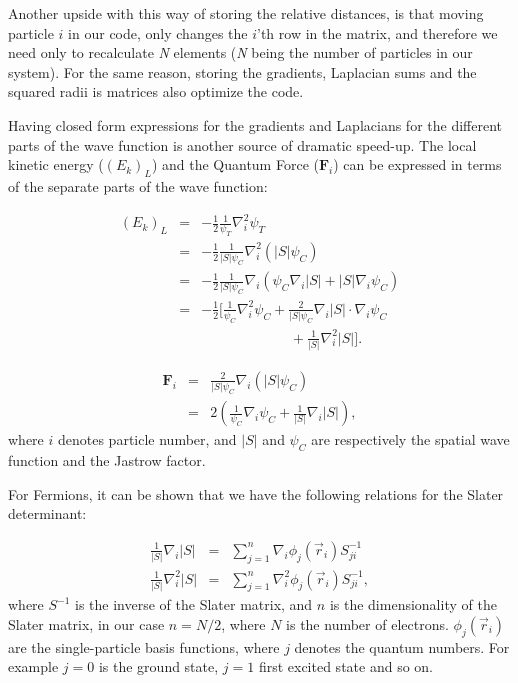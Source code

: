 Another upside with this way of storing the relative distances, is that moving particle $i$ in our code, only changes the $i$'th row in the matrix, and therefore we need only to recalculate \textit{N} elements (\textit{N} being the number of particles in our system). For the same reason, storing the gradients, Laplacian sums and the squared radii is matrices also optimize the code. 

Having closed form expressions for the gradients and Laplacians for the different parts of the wave function is another source of dramatic speed-up. The local kinetic energy ($(E_k)_L$) and the Quantum Force ($\mathbf{F}_i$) can be expressed in terms of the separate parts of the wave function:

\begin{eqnarray}
(E_k)_L &=& -\frac{1}{2}\frac{1}{\psi_T}\nabla_i^2 \psi_T \\
&=& -\frac{1}{2}\frac{1}{|S|\psi_C}\nabla_i^2(|S|\psi_C) \nonumber\\
&=& -\frac{1}{2}\frac{1}{|S|\psi_C} \nabla_i \left(\psi_C\nabla_i |S| + |S|\nabla_i \psi_C\right)\nonumber  \\
&=& -\frac{1}{2}\Big[\frac{1}{\psi_C}\nabla_i^2 \psi_C + \frac{2}{|S|\psi_C}\nabla_i|S|\cdot\nabla_i\psi_C \nonumber\\
&& \qquad\qquad\qquad\,\,+\frac{1}{|S|}\nabla_i^2 |S|\Big].\nonumber 
\label{eq:kinetic_analytic}
\end{eqnarray}

\begin{eqnarray}
 \mathbf{F}_i &=& \frac{2}{|S|\psi_C}\nabla_i( |S|\psi_C) \\
&=& 2\left(\frac{1}{\psi_C}\nabla_i \psi_C + \frac{1}{|S|}\nabla_i |S|\right),\nonumber
\label{eq:QF}
\end{eqnarray}
where $i$ denotes particle number, and $|S|$ and $\psi_C$ are respectively the spatial wave function and the Jastrow factor.

For Fermions, it can be shown that we have the following relations for the Slater determinant\cite{larseivind}:

\begin{eqnarray}
 \frac{1}{|S|}\nabla_i |S| &=& \displaystyle\sum_{j=1}^n \nabla_i \phi_j(\vec r_i)S^{-1}_{ji} \\ 
\frac{1}{|S|}\nabla^2_i |S| &=& \displaystyle\sum_{j=1}^n \nabla^2_i \phi_j(\vec r_i)S^{-1}_{ji},\nonumber
\label{eq:grad_lapl_S}
\end{eqnarray}
where $S^{-1}$ is the inverse of the Slater matrix, and $n$ is the dimensionality of the Slater matrix, in our case $n=N/2$, where $N$ is the number of electrons. $\phi_j(\vec r_i)$ are the single-particle basis functions, where $j$ denotes the quantum numbers. For example $j=0$ is the ground state, $j=1$ first excited state and so on. 

